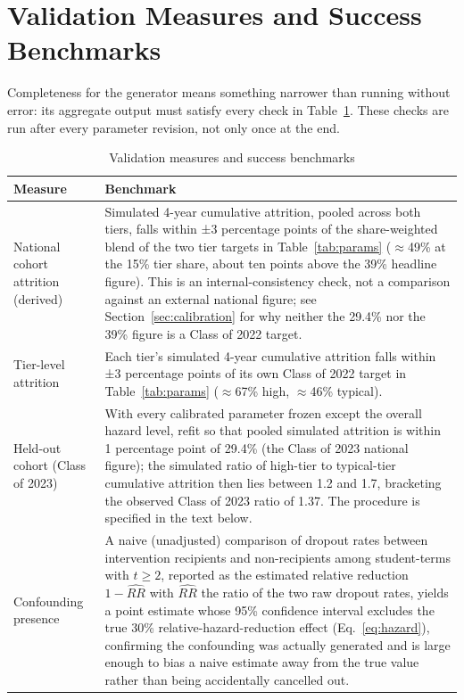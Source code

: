 \documentclass[11pt]{article}
\begin{document}
\FloatBarrier
\section{Validation Measures and Success Benchmarks}
\label{sec:validation}

Completeness for the generator means something narrower than running without error: its aggregate output must satisfy every check in Table~\ref{tab:validation}. These checks are run after every parameter revision, not only once at the end.

\begin{table}[t]
\caption{Validation measures and success benchmarks}
\label{tab:validation}
\centering
\small
\renewcommand{\arraystretch}{1.2}
\begin{tabular}{@{}p{}p{}@{}}
\toprule
\textbf{Measure} & \textbf{Benchmark} \\
\midrule
National cohort attrition (derived) & Simulated 4-year cumulative attrition, pooled across both tiers, falls within ±3 percentage points of the share-weighted blend of the two tier targets in Table~\ref{tab:params} ($\approx$49\% at the 15\% tier share, about ten points above the 39\% headline figure). This is an internal-consistency check, not a comparison against an external national figure; see Section~\ref{sec:calibration} for why neither the 29.4\% nor the 39\% figure is a Class of 2022 target. \\
\addlinespace
Tier-level attrition & Each tier's simulated 4-year cumulative attrition falls within ±3 percentage points of its own Class of 2022 target in Table~\ref{tab:params} ($\approx$67\% high, $\approx$46\% typical). \\
\addlinespace
Held-out cohort (Class of 2023) & With every calibrated parameter frozen except the overall hazard level, refit so that pooled simulated attrition is within 1 percentage point of 29.4\% (the Class of 2023 national figure); the simulated ratio of high-tier to typical-tier cumulative attrition then lies between 1.2 and 1.7, bracketing the observed Class of 2023 ratio of 1.37. The procedure is specified in the text below. \\
\addlinespace
Confounding presence & A naive (unadjusted) comparison of dropout rates between intervention recipients and non-recipients among student-terms with $t \ge 2$, reported as the estimated relative reduction $1-\widehat{RR}$ with $\widehat{RR}$ the ratio of the two raw dropout rates, yields a point estimate whose 95\% confidence interval excludes the true 30\% relative-hazard-reduction effect (Eq.~\ref{eq:hazard}), confirming the confounding was actually generated and is large enough to bias a naive estimate away from the true value rather than being accidentally cancelled out. \\

\end{tabular}
\end{table}
\end{document}
